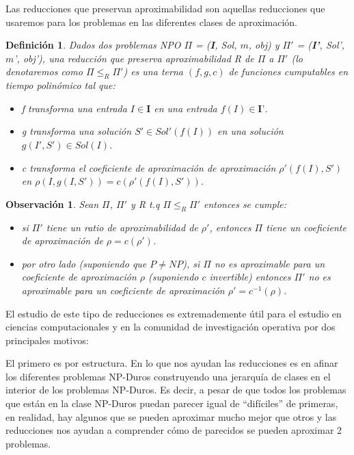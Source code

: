 \documentclass[a4paper,12pt,titlepage]{article}
\newtheorem{defi}{Definici\'on}[section]
\newtheorem{obs}{Observaci\'on}[section]
\begin{document}
Las reducciones que preservan aproximabilidad son aquellas reducciones que usaremos para los problemas en las diferentes clases de aproximaci\'on.

\begin{defi}

Dados dos problemas NPO $\Pi$ = (\textbf{I}, Sol, $m$, obj) y $\Pi'$ = (\textbf{I'}, Sol', $m$', obj'), una reducci\'on que preserva aproximabilidad R  de $\Pi$ a $\Pi'$ (lo denotaremos como $\Pi \leq_{R} \Pi'$) es una terna $(f, g, c)$ de funciones cumputables en tiempo polin\'omico tal que:

\begin{itemize}

\item f transforma una entrada $I\in\textbf{I}$ en una entrada $f(I)\in\textbf{I'}$.
\item g transforma una soluci\'on $S'\in Sol'(f(I))$ en una soluci\'on $g(I',S')\in Sol(I)$.
\item c transforma el coeficiente de aproximaci\'on de aproximaci\'on $\rho'(f(I),S')$ en $\rho(I,g(I,S')) = c(\rho'(f(I),S')) $.

\end{itemize}

\end{defi}

\begin{obs}

Sean $\Pi$, $\Pi'$ y R t.q $\Pi \leq_{R} \Pi'$ entonces se cumple:

\begin{itemize}

\item si $\Pi'$ tiene un ratio de aproximabilidad de $\rho'$, entonces $\Pi$ tiene un coeficiente de aproximaci\'on de $\rho = c(\rho')$.
\item por otro lado (suponiendo que $P \neq NP$), si $\Pi$ no es aproximable para un coeficiente de aproximaci\'on $\rho$ (suponiendo $c$ invertible) entonces $\Pi'$ no es aproximable para un coeficiente de aproximaci\'on $\rho'=c^{-1}(\rho)$.

\end{itemize}

\end{obs}

El estudio de este tipo de reducciones es extremademente \'util para el estudio en ciencias computacionales y en la comunidad de investigaci\'on operativa por dos principales motivos:

El primero es por estructura. En lo que nos ayudan las reducciones es en afinar los diferentes problemas NP-Duros construyendo una jerarqu\'ia de clases en el interior de los problemas NP-Duros. Es decir, a pesar de que todos los problemas que est\'an en la clase NP-Duros puedan parecer igual de ``dif\'iciles'' de primeras, en realidad, hay algunos que se pueden aproximar mucho mejor que otros y las reducciones nos ayudan a comprender c\'omo de parecidos se pueden aproximar 2 problemas.
\end{document}
